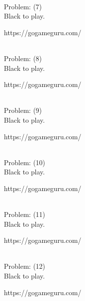 \documentclass[11pt]{article}
\begin{document}
\begin{minipage}[t]{0.5\textwidth}
  {\centering
  
\\
  Problem: (7)\\
  Black to play.

https://gogameguru.com/\\
  }
\end{minipage}
\begin{minipage}[t]{0.5\textwidth}
  {\centering
  
\\
  Problem: (8)\\
  Black to play.

https://gogameguru.com/\\
  }
\end{minipage}
\begin{minipage}[t]{0.5\textwidth}
  {\centering
  
\\
  Problem: (9)\\
  Black to play.

https://gogameguru.com/\\
  }
\end{minipage}
\begin{minipage}[t]{0.5\textwidth}
  {\centering
  
\\
  Problem: (10)\\
  Black to play.

https://gogameguru.com/\\
  }
\end{minipage}
\begin{minipage}[t]{0.5\textwidth}
  {\centering
  
\\
  Problem: (11)\\
  Black to play.

https://gogameguru.com/\\
  }
\end{minipage}
\begin{minipage}[t]{0.5\textwidth}
  {\centering
  
\\
  Problem: (12)\\
  Black to play.

https://gogameguru.com/\\
  }
\end{minipage}
\end{document}
